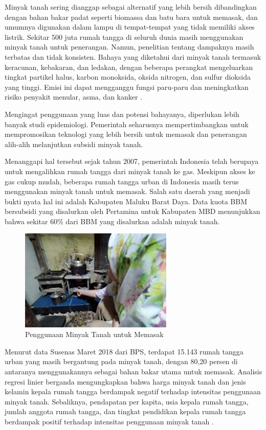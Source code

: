 Minyak tanah sering dianggap sebagai alternatif yang lebih bersih dibandingkan dengan bahan bakar padat seperti biomassa dan batu bara untuk memasak, dan umumnya digunakan dalam lampu di tempat-tempat yang tidak memiliki akses listrik. Sekitar 500 juta rumah tangga di seluruh dunia masih menggunakan minyak tanah untuk penerangan. Namun, penelitian tentang dampaknya masih terbatas dan tidak konsisten. Bahaya yang diketahui dari minyak tanah termasuk keracunan, kebakaran, dan ledakan, dengan beberapa perangkat mengeluarkan tingkat partikel halus, karbon monoksida, oksida nitrogen, dan sulfur dioksida yang tinggi. Emisi ini dapat mengganggu fungsi paru-paru dan meningkatkan risiko penyakit menular, asma, dan kanker \citep{Lam_Smith_Gauthier_Bates_2012}.

Mengingat penggunaan yang luas dan potensi bahayanya, diperlukan lebih banyak studi epidemiologi. Pemerintah seharusnya mempertimbangkan untuk mempromosikan teknologi yang lebih bersih untuk memasak dan penerangan alih-alih melanjutkan subsidi minyak tanah.

Menanggapi hal tersebut sejak tahun 2007, pemerintah Indonesia telah berupaya untuk mengalihkan rumah tangga dari minyak tanah ke gas. Meskipun akses ke gas cukup mudah, beberapa rumah tangga urban di Indonesia masih terus menggunakan minyak tanah untuk memasak. Salah satu daerah yang menjadi bukti nyata hal ini adalah Kabupaten Maluku Barat Daya. Data kuota BBM bersubsidi yang disalurkan oleh Pertamina untuk Kabupaten MBD menunjukkan bahwa sekitar 60\% dari BBM yang disalurkan adalah minyak tanah.

\begin{figure}[h!]
    \centering
    \includegraphics[width=0.65\textwidth]{gambar/masak-minyak-tanah.jpg}
    \caption{Penggunaan Minyak Tanah untuk Memasak \citep{Jumahudin_2021}}
    \label{fig:ilus-masak-minyak-tanah}
\end{figure}

Menurut data Susenas Maret 2018 dari BPS, terdapat 15.143 rumah tangga urban yang masih bergantung pada minyak tanah, dengan 80,20 persen di antaranya menggunakannya sebagai bahan bakar utama untuk memasak. Analisis regresi linier berganda mengungkapkan bahwa harga minyak tanah dan jenis kelamin kepala rumah tangga berdampak negatif terhadap intensitas penggunaan minyak tanah. Sebaliknya, pendapatan per kapita, usia kepala rumah tangga, jumlah anggota rumah tangga, dan tingkat pendidikan kepala rumah tangga berdampak positif terhadap intensitas penggunaan minyak tanah \citep{Soraya_Afiatno_2021}.



